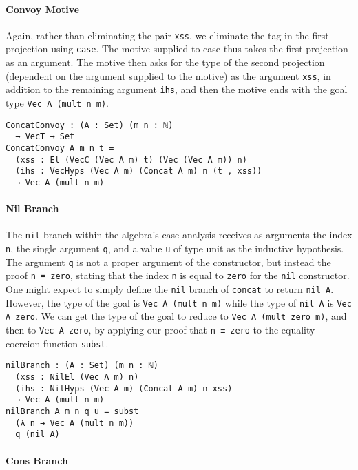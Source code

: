\documentclass[preprint,nonatbib]{sigplanconf}
\begin{document}
\paragraph{Convoy Motive}

Again, rather than eliminating the pair {\tt xss}, we eliminate the
tag in the first projection using {\tt case}. The motive supplied to
case thus takes the first projection as an argument. The motive then
asks for the type of the second projection (dependent on the argument
supplied to the motive) as the argument {\tt xss}, in addition to the
remaining argument {\tt ihs}, and then the motive ends with the goal type
{\tt Vec A (mult n m)}.

\begin{verbatim}
ConcatConvoy : (A : Set) (m n : ℕ)
  → VecT → Set
ConcatConvoy A m n t =
  (xss : El (VecC (Vec A m) t) (Vec (Vec A m)) n)
  (ihs : VecHyps (Vec A m) (Concat A m) n (t , xss))
  → Vec A (mult n m)
\end{verbatim}

\paragraph{Nil Branch}

The {\tt nil} branch within the algebra's case analysis receives as
arguments the index {\tt n}, the single argument {\tt q}, and a value
{\tt u} of type unit as the inductive hypothesis. The argument
{\tt q} is not a proper argument of the constructor, but instead the
proof {\tt n ≡ zero}, stating that the index {\tt n} is equal to
{\tt zero} for the {\tt nil} constructor. One might expect to simply
define the {\tt nil} branch of {\tt concat} to return {\tt nil A}.
However, the type of the goal is {\tt Vec A (mult n m)} while the type
of {\tt nil A} is {\tt Vec A zero}. We can get the type of the goal to
reduce to {\tt Vec A (mult zero m)}, and then to {\tt Vec A zero}, by
applying our proof that {\tt n ≡ zero} to the equality coercion
function {\tt subst}.

\begin{verbatim}
nilBranch : (A : Set) (m n : ℕ)
  (xss : NilEl (Vec A m) n)
  (ihs : NilHyps (Vec A m) (Concat A m) n xss)
  → Vec A (mult n m)
nilBranch A m n q u = subst
  (λ n → Vec A (mult n m))
  q (nil A)
\end{verbatim}

\paragraph{Cons Branch}
\end{document}
